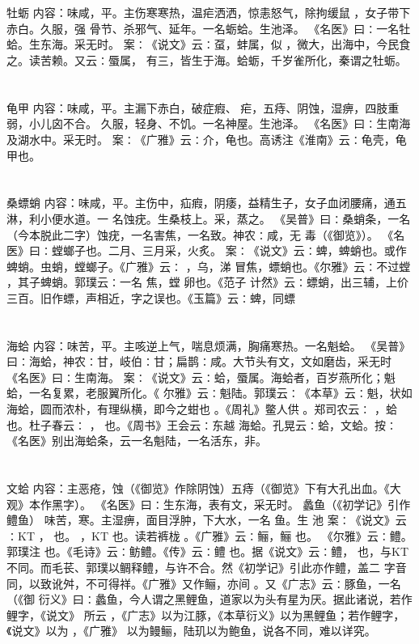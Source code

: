 \documentclass[12pt,UTF8]{ctexbook}
\begin{document}
\section{}牡蛎
内容：味咸，平。主伤寒寒热，温疟洒洒，惊恚怒气，除拘缓鼠 ，女子带下赤白。久服，强 
骨节、杀邪气、延年。一名蛎蛤。生池泽。 
《名医》曰∶一名牡蛤。生东海。采无时。 
案∶《说文》云∶虿，蚌属，似 ，微大，出海中，今民食之。读苦赖。又云∶蜃属， 
有三，皆生于海。蛤蛎，千岁雀所化，秦谓之牡蛎。 


\section{}龟甲
内容：味咸，平。主漏下赤白，破症瘕、 疟，五痔、阴蚀，湿痹，四肢重弱，小儿囟不合。 
久服，轻身、不饥。一名神屋。生池泽。 
《名医》曰∶生南海及湖水中。采无时。 
案∶《广雅》云∶介，龟也。高诱注《淮南》云∶龟壳，龟甲也。 


\section{}桑螵蛸
内容：味咸，平。主伤中，疝瘕，阴痿，益精生子，女子血闭腰痛，通五淋，利小便水道。一 
名蚀疣。生桑枝上。采，蒸之。 
《吴普》曰∶桑蛸条，一名（今本脱此二字）蚀疣，一名害焦，一名致。神农∶咸，无 
毒（《御览》）。 
《名医》曰∶螳螂子也。二月、三月采，火炙。 
案∶《说文》云∶蜱，蜱蛸也。或作蜱蛸。虫蛸，螳螂子。《广雅》云∶ ，乌，涕 
冒焦，螵蛸也。《尔雅》云∶不过螳 ，其子蜱蛸。郭璞云∶一名 焦，螳 卵也。《范子 
计然》云∶螵蛸，出三辅，上价三百。旧作螵，声相近，字之误也。《玉篇》云∶蜱，同螵 


\section{}海蛤
内容：味苦，平。主咳逆上气，喘息烦满，胸痛寒热。一名魁蛤。 
《吴普》曰∶海蛤，神农∶甘，岐伯∶甘；扁鹊∶咸。大节头有文，文如磨齿，采无时 
《名医》曰∶生南海。 
案∶《说文》云∶蛤，蜃属。海蛤者，百岁燕所化；魁蛤，一名复累，老服翼所化。《 
尔雅》云∶魁陆。郭璞云∶《本草》云∶魁，状如海蛤，圆而浓朴，有理纵横，即今之蚶也 
。《周礼》鳖人供 。郑司农云∶ ，蛤也。杜子春云∶ ， 也。《周书》王会云∶东越 
海蛤。孔晃云∶蛤，文蛤。按∶《名医》别出海蛤条，云一名魁陆，一名活东，非。 


\section{}文蛤
内容：主恶疮，蚀（《御览》作除阴蚀）五痔（《御览》下有大孔出血。《大观》本作黑字）。 
《名医》曰∶生东海，表有文，采无时。 
蠡鱼（《初学记》引作鳢鱼） 味苦，寒。主湿痹，面目浮肿，下大水，一名 鱼。生 
池 
案∶《说文》云∶KT ， 也。 ，KT 也。读若裤栊 。《广雅》云∶鲡，鲡 也。 
《尔雅》云∶鳢。郭璞注 也。《毛诗》云∶鲂鳢。《传》云∶鳢 也。据《说文》云∶鳢， 
也，与KT 不同。而毛苌、郭璞以鲷释鳢，与许不合。然《初学记》引此亦作鳢，盖二 
字音同，以致讹舛，不可得祥。《广雅》又作鲡，亦间 。又《广志》云∶豚鱼，一名 （《御 
衍义》曰∶蠡鱼，今人谓之黑鲤鱼，道家以为头有星为厌。据此诸说，若作鲤字，《说文》 
所云 ，《广志》以为江豚，《本草衍义》以为黑鲤鱼；若作鲤字，《说文》以为 ，《广雅》 
以为鳗鲡，陆玑以为鲍鱼，说各不同，难以详究。 
\end{document}
